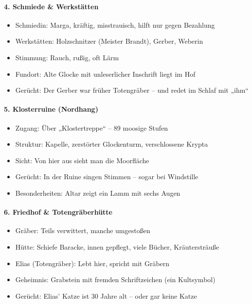 \paragraph{4. Schmiede \& Werkstätten}
\begin{itemize}
\item Schmiedin: Marga, kräftig, misstrauisch, hilft nur gegen Bezahlung
\item Werkstätten: Holzschnitzer (Meister Brandt), Gerber, Weberin
\item Stimmung: Rauch, rußig, oft Lärm
\item Fundort: Alte Glocke mit unleserlicher Inschrift liegt im Hof
\item Gerücht: Der Gerber war früher Totengräber – und redet im Schlaf mit „ihm“
\end{itemize}

\paragraph{5. Klosterruine (Nordhang)}
\begin{itemize}
\item Zugang: Über „Klostertreppe“ – 89 moosige Stufen
\item Struktur: Kapelle, zerstörter Glockenturm, verschlossene Krypta
\item Sicht: Von hier aus sieht man die Moorfläche
\item Gerücht: In der Ruine singen Stimmen – sogar bei Windstille
\item Besonderheiten: Altar zeigt ein Lamm mit sechs Augen
\end{itemize}

\paragraph{6. Friedhof \& Totengräberhütte}
\begin{itemize}
\item Gräber: Teils verwittert, manche umgestoßen
\item Hütte: Schiefe Baracke, innen gepflegt, viele Bücher, Kräutersträuße
\item Elias (Totengräber): Lebt hier, spricht mit Gräbern
\item Geheimnis: Grabstein mit fremden Schriftzeichen (ein Kultsymbol)
\item Gerücht: Elias’ Katze ist 30 Jahre alt – oder gar keine Katze
\end{itemize}

